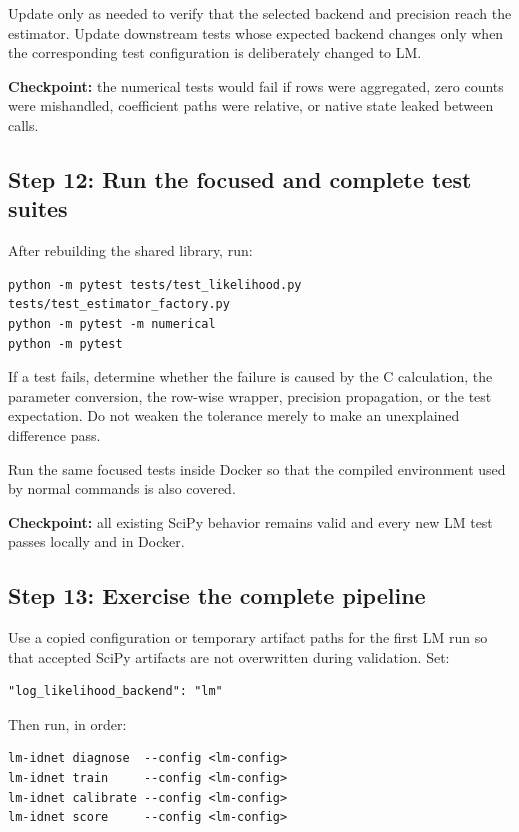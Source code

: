 \documentclass[11pt,a4paper]{article}
\begin{document}
Update  only as needed to verify that the
selected backend and precision reach the estimator. Update downstream tests
whose expected backend changes only when the corresponding test configuration
is deliberately changed to LM.

\textbf{Checkpoint:} the numerical tests would fail if rows were aggregated,
zero counts were mishandled, coefficient paths were relative, or native state
leaked between calls.

\subsection{Step 12: Run the focused and complete test suites}

After rebuilding the shared library, run:

\begin{verbatim}
python -m pytest tests/test_likelihood.py tests/test_estimator_factory.py
python -m pytest -m numerical
python -m pytest
\end{verbatim}

If a test fails, determine whether the failure is caused by the C calculation,
the parameter conversion, the row-wise wrapper, precision propagation, or the
test expectation. Do not weaken the tolerance merely to make an unexplained
difference pass.

Run the same focused tests inside Docker so that the compiled environment used
by normal commands is also covered.

\textbf{Checkpoint:} all existing SciPy behavior remains valid and every new LM
test passes locally and in Docker.

\subsection{Step 13: Exercise the complete pipeline}

Use a copied configuration or temporary artifact paths for the first LM run so
that accepted SciPy artifacts are not overwritten during validation. Set:

\begin{verbatim}
"log_likelihood_backend": "lm"
\end{verbatim}

Then run, in order:

\begin{verbatim}
lm-idnet diagnose  --config <lm-config>
lm-idnet train     --config <lm-config>
lm-idnet calibrate --config <lm-config>
lm-idnet score     --config <lm-config>
\end{verbatim}
\end{document}

